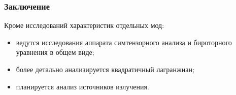 \documentclass[compress]{beamer}
\begin{document}

    \begin{frame}\frametitle{Заключение}

        Кроме исследований характеристик отдельных мод:
        \begin{itemize}
            \item ведутся исследования аппарата симтензорного анализа и бироторного уравнения в общем виде;
            \item более детально анализируется квадратичный лагранжиан;
            \item планируется анализ источников излучения.
        \end{itemize}

    \end{frame}
\end{document}
